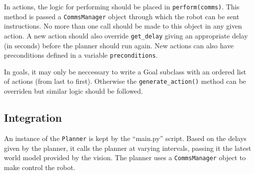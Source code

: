 In actions, the logic for performing should be placed in \texttt{perform(comms)}. This method is passed a \texttt{CommsManager} object through which the robot can be sent instructions. No more than one call should be made to this object in any given action. A new action should also override \texttt{get\_delay} giving an appropriate delay (in seconds) before the planner should run again. New actions can also have preconditions defined in a variable \texttt{preconditions}.

In goals, it may only be neccessary to write a Goal subclass with an ordered list of actions (from last to first). Otherwise the \texttt{generate\_action()} method can be overriden but similar logic should be followed.

\subsection{Integration}

An instance of the \texttt{Planner} is kept by the ``main.py'' script. Based on the delays given by the planner, it calls the planner at varying intervals, passing it the latest world model provided by the vision. The planner uses a \texttt{CommsManager} object to make control the robot.
